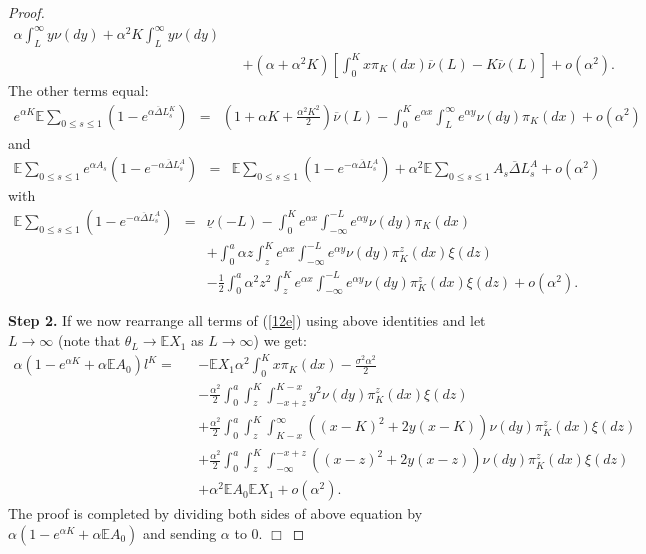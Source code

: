 \documentclass{aptpub}
\begin{document}
\begin{proof}
\begin{eqnarray*}
\alpha\int_L^{\infty}y\nu(dy)+\alpha^2K\int_L^{\infty}y\nu(dy)
\\ &&+(\alpha+\alpha^2K)\left[\int_0^Kx\pi_K(dx)\overline{\nu}(L)-K\overline{\nu}(L)\right]+o(\alpha^2).
\end{eqnarray*}
The other terms equal:
\begin{eqnarray*}
e^{\alpha K}\mathbb{E}\sum_{0\leq s\leq 1}(1-e^{\alpha\overline{\Delta}L_s^K})
&=&(1+\alpha K+\frac{\alpha^2K^2}{2})\overline{\nu}(L)-\int_0^Ke^{\alpha x}\int_L^{\infty}e^{\alpha y}\nu(dy)\pi_K(dx)+o(\alpha^2)
\end{eqnarray*}
and
\begin{eqnarray*}
\mathbb{E}\sum_{0\leq s\leq 1}e^{\alpha A_s}(1-e^{-\alpha\overline{\Delta}L_s^A})
&=&\mathbb{E}\sum_{0\leq s\leq 1}(1-e^{-\alpha\overline{\Delta}L_s^A})+\alpha^2\mathbb{E}\sum_{0\leq s\leq 1} A_s\overline{\Delta}L_s^A+o(\alpha^2)
\end{eqnarray*}
with
\begin{eqnarray*}
\mathbb{E}\sum_{0\leq s\leq 1}(1-e^{-\alpha\overline{\Delta}L_s^A})&=&
\underline{\nu}(-L)-\int_0^Ke^{\alpha x}\int_{-\infty}^{-L}e^{\alpha y}\nu(dy)\pi_K(dx)\\ &&+\int_0^a\alpha z\int_z^Ke^{\alpha x}\int_{-\infty}^{-L}e^{\alpha y}\nu(dy)\pi_K^z(dx)\xi(dz)\\&&-\frac{1}{2}\int_0^a\alpha^2 z^2\int_z^Ke^{\alpha x}\int_{-\infty}^{-L}e^{\alpha y}\nu(dy)\pi_K^z(dx)\xi(dz)+o(\alpha^2).
\end{eqnarray*}

{\bf Step 2.}
If we now rearrange all terms of (\ref{12e}) using above identities and let $L\to\infty$ (note that $\theta_L\to\mathbb{E}X_1$ as $L\to\infty$) we get:
\begin{eqnarray*}
\alpha(1-e^{\alpha K}+\alpha\mathbb{E}A_0)l^K=&&-\mathbb{E}X_1\alpha^2\int_0^Kx\pi_K(dx)-\frac{\sigma^2\alpha^2}{2}\\ &&-\frac{\alpha^2}{2}\int_0^a\int_z^K\int_{-x+z}^{K-x}y^2\nu(dy)\pi_K^z(dx)\xi(dz)\\ &&+\frac{\alpha^2}{2}\int_0^a\int_z^K\int_{K-x}^{\infty}((x-K)^2+2y(x-K))\nu(dy)\pi_K^z(dx)\xi(dz)\\ &&+\frac{\alpha^2}{2}\int_0^a\int_z^K\int_{-\infty}^{-x+z}((x-z)^2+2y(x-z))\nu(dy)\pi_K^z(dx)\xi(dz)\\ &&+\alpha^2\mathbb{E}A_0\mathbb{E}X_1+o(\alpha^2).
\end{eqnarray*}
The proof is completed by dividing both sides of above equation by $\alpha(1-e^{\alpha K}+\alpha\mathbb{E}A_0)$ and sending $\alpha$ to 0.
{\newline\vspace{3mm}\hfill $\Box$}\end{proof}
\end{document}
